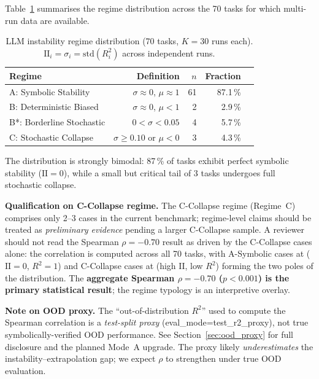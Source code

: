 \documentclass[twoside,11pt]{article}
\newcommand{\Rsq}{R^{2}}
\newcommand{\II}{\mathrm{II}}
\begin{document}
Table~\ref{tab:instability} summarises the regime distribution across the 70 tasks
for which multi-run data are available.

\begin{table}[h]
\centering
\caption{LLM instability regime distribution (70 tasks, $K=30$ runs each).
$\II_i = \sigma_i = \mathrm{std}(R^2_i)$ across independent runs.}
\label{tab:instability}
\begin{tabular}{lrrrr}
\toprule
Regime & Definition & $n$ & Fraction \\
\midrule
A: Symbolic Stability   & $\sigma\approx0$, $\mu\approx1$            & 61 & 87.1\,\% \\
B: Deterministic Biased & $\sigma\approx0$, $\mu<1$                  &  2 & 2.9\,\%  \\
B*: Borderline Stochastic & $0 < \sigma < 0.05$                      &  4 & 5.7\,\%  \\
C: Stochastic Collapse  & $\sigma \ge 0.10$ or $\mu < 0$             &  3 & 4.3\,\%  \\
\bottomrule
\end{tabular}
\end{table}

The distribution is strongly bimodal: 87\,\% of tasks exhibit perfect symbolic
stability ($\II=0$), while a small but critical tail of 3 tasks undergoes full
stochastic collapse.

\textbf{Qualification on C-Collapse regime.}  The C-Collapse regime
(Regime~C) comprises only 2--3 cases in the current benchmark; regime-level
claims should be treated as \emph{preliminary evidence} pending a larger
C-Collapse sample.  A reviewer should not read the Spearman $\rho=-0.70$ result
as driven by the C-Collapse cases alone: the correlation is computed across all
70 tasks, with A-Symbolic cases at ($\II=0$, $\Rsq=1$) and C-Collapse cases at
(high $\II$, low $\Rsq$) forming the two poles of the distribution.  The
\textbf{aggregate Spearman $\rho=-0.70$ ($p<0.001$) is the primary statistical
result}; the regime typology is an interpretive overlay.

\textbf{Note on OOD proxy.}  The ``out-of-distribution $\Rsq$'' used to compute
the Spearman correlation is a \emph{test-split proxy} (eval\_mode=test\_r2\_proxy),
not true symbolically-verified OOD performance.  See Section~\ref{sec:ood_proxy}
for full disclosure and the planned Mode~A upgrade.  The proxy likely
\emph{underestimates} the instability--extrapolation gap; we expect $\rho$ to
strengthen under true OOD evaluation.
\end{document}
